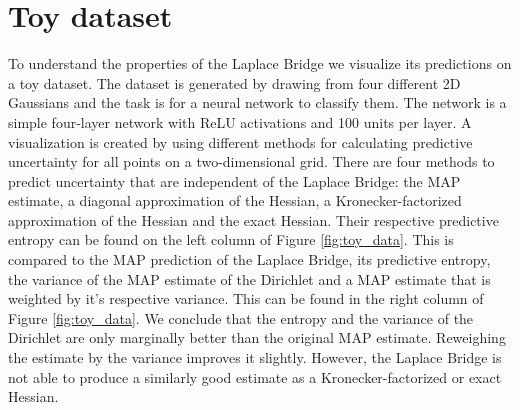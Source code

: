 \section{Toy dataset}
\label{subsec:exp4_toy_dataset}

To understand the properties of the Laplace Bridge we visualize its predictions on a toy dataset. The dataset is generated by drawing from four different 2D Gaussians and the task is for a neural network to classify them. The network is a simple four-layer network with ReLU activations and 100 units per layer. A visualization is created by using different methods for calculating predictive uncertainty for all points on a two-dimensional grid. There are four methods to predict uncertainty that are independent of the Laplace Bridge: the MAP estimate, a diagonal approximation of the Hessian, a Kronecker-factorized approximation of the Hessian and the exact Hessian. Their respective predictive entropy can be found on the left column of Figure \ref{fig:toy_data}. This is compared to the MAP prediction of the Laplace Bridge, its predictive entropy, the variance of the MAP estimate of the Dirichlet and a MAP estimate that is weighted by it's respective variance. This can be found in the right column of Figure \ref{fig:toy_data}. We conclude that the entropy and the variance of the Dirichlet are only marginally better than the original MAP estimate. Reweighing the estimate by the variance improves it slightly. However, the Laplace Bridge is not able to produce a similarly good estimate as a Kronecker-factorized or exact Hessian. 



